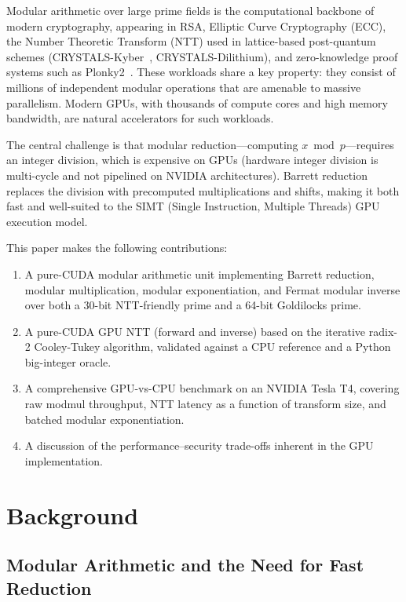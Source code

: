 \documentclass[conference]{IEEEtran}
\begin{document}
Modular arithmetic over large prime fields is the computational backbone of modern cryptography,
appearing in RSA, Elliptic Curve Cryptography (ECC), the Number Theoretic Transform (NTT) used in
lattice-based post-quantum schemes (CRYSTALS-Kyber~\cite{kyber}, CRYSTALS-Dilithium), and
zero-knowledge proof systems such as Plonky2~\cite{plonky2}. These workloads share a key property:
they consist of millions of independent modular operations that are amenable to massive parallelism.
Modern GPUs, with thousands of compute cores and high memory bandwidth, are natural accelerators for
such workloads.

The central challenge is that modular reduction—computing $x \bmod p$—requires an integer
division, which is expensive on GPUs (hardware integer division is multi-cycle and not pipelined on
NVIDIA architectures). Barrett reduction~\cite{barrett} replaces the division with precomputed
multiplications and shifts, making it both fast and well-suited to the SIMT (Single Instruction,
Multiple Threads) GPU execution model.

This paper makes the following contributions:
\begin{enumerate}
  \item A pure-CUDA modular arithmetic unit implementing Barrett reduction, modular multiplication,
        modular exponentiation, and Fermat modular inverse over both a 30-bit NTT-friendly prime and
        a 64-bit Goldilocks prime.
  \item A pure-CUDA GPU NTT (forward and inverse) based on the iterative radix-2 Cooley-Tukey
        algorithm, validated against a CPU reference and a Python big-integer oracle.
  \item A comprehensive GPU-vs-CPU benchmark on an NVIDIA Tesla T4, covering raw modmul
        throughput, NTT latency as a function of transform size, and batched modular exponentiation.
  \item A discussion of the performance--security trade-offs inherent in the GPU implementation.
\end{enumerate}

\section{Background}
\label{sec:background}

\subsection{Modular Arithmetic and the Need for Fast Reduction}
\end{document}
